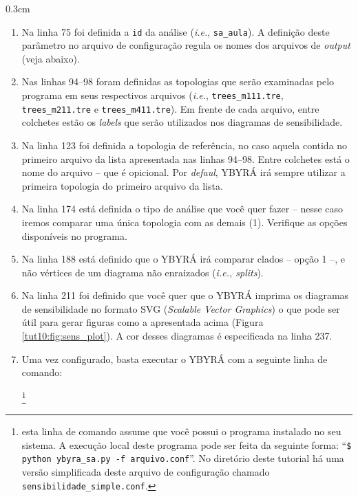 \begin{refsection}
\begin {myindentpar}{0.3cm}
\begin{enumerate}[\itshape i.]
	\item{Na linha 75 foi definida a \texttt{id} da análise (\textit{i.e.}, \texttt{sa\_aula}). A definição deste parâmetro no arquivo de configuração regula os nomes dos arquivos de \textit{output} (veja abaixo).}
	\item{Nas linhas 94--98 foram definidas as topologias que serão examinadas pelo programa em seus respectivos arquivos  (\textit{i.e.}, \texttt{trees\_m111.tre}, \texttt{trees\_m211.tre} e \texttt{trees\_m411.tre}). Em frente de cada arquivo, entre colchetes estão os \textit{labels} que serão utilizados nos diagramas de sensibilidade.}
	\item{Na linha 123 foi definida a topologia de referência, no caso aquela contida no primeiro arquivo da lista apresentada nas linhas 94--98. Entre colchetes está o nome do arquivo -- que é opicional. Por \textit{defaul}, YBYRÁ irá sempre utilizar a primeira topologia do primeiro arquivo da lista.}
	\item{Na linha 174 está definida o tipo de análise que você quer fazer -- nesse caso iremos comparar uma única topologia com as demais (1). Verifique as opções disponíveis no programa.}
	\item{Na linha 188 está definido que o YBYRÁ irá comparar clados -- opção 1 --, e não vértices de um diagrama não enraizados (\textit{i.e., splits}).}
	\item{Na linha 211 foi definido que você quer que o YBYRÁ imprima os diagramas de sensibilidade no formato SVG (\textit{Scalable Vector Graphics}) o que pode ser útil para gerar figuras como a apresentada acima (Figura \ref{tut10:fig:sens_plot}). A cor desses diagramas é especificada na linha 237.}
	\item{Uma vez configurado, basta executar o YBYRÁ com a seguinte linha de comando:}

	\footnote{ esta linha de comando assume que você possui o programa instalado no seu sistema. A execução local deste programa pode ser feita da seguinte forma: ``\texttt{\$ python ybyra\_sa.py -f arquivo.conf}''. No diretório deste tutorial há uma versão simplificada deste arquivo de configuração chamado \texttt{sensibilidade\_simple.conf}.}

\end{enumerate}
\end{myindentpar}	


\end{refsection}
